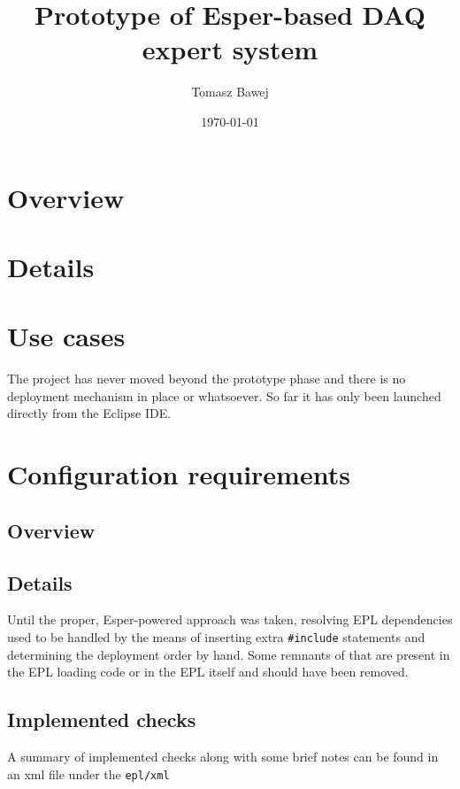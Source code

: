 \documentclass[11pt,oneside,a4paper]{article}
\title{Prototype of Esper-based DAQ expert system}
\date{\today}
\author{Tomasz Bawej}
\begin{document}
\maketitle

\tableofcontents
\clearpage

\section{Overview}

\section{Details}


\section{Use cases}

The project has never moved beyond the prototype phase and there is no deployment mechanism in place or whatsoever.
So far it has only been launched directly from the Eclipse IDE.


\section{Configuration requirements}


\subsection{Overview}
\subsection{Details}

Until the proper, Esper-powered approach was taken, resolving EPL dependencies used to be handled by the means of inserting extra \texttt{#include} statements and determining the deployment order by hand.
Some remnants of that are present in the EPL loading code or in the EPL itself and should have been removed.

\subsection{Implemented checks}
A summary of implemented checks along with some brief notes can be found in an xml file under the \texttt{epl/xml}

%
\end{document}
